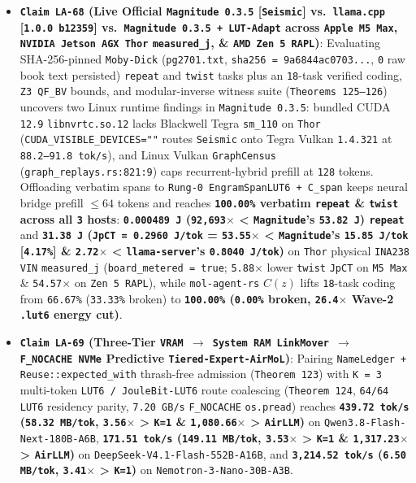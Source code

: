 \documentclass[10pt]{article}
\begin{document}
\begin{itemize}
  \item \textbf{\texttt{Claim LA-68} (Live Official \texttt{Magnitude 0.3.5} [\texttt{Seismic}] vs.\ \texttt{llama.cpp} [\texttt{1.0.0 b12359}] vs.\ \texttt{Magnitude 0.3.5 + LUT-Adapt} across \texttt{Apple M5 Max}, \texttt{NVIDIA Jetson AGX Thor} \texttt{measured\_j}, \& \texttt{AMD Zen 5 RAPL})}: Evaluating SHA-256-pinned \texttt{Moby-Dick} (\texttt{pg2701.txt}, \texttt{sha256 = 9a6844ac0703...}, \texttt{0} raw book text persisted) \texttt{repeat} and \texttt{twist} tasks plus an \texttt{18}-task verified coding, \texttt{Z3 QF\_BV} bounds, and modular-inverse witness suite (\texttt{Theorems 125--126}) uncovers two Linux runtime findings in \texttt{Magnitude 0.3.5}: bundled CUDA \texttt{12.9} \texttt{libnvrtc.so.12} lacks Blackwell Tegra \texttt{sm\_110} on \texttt{Thor} (\texttt{CUDA\_VISIBLE\_DEVICES=""} routes \texttt{Seismic} onto Tegra Vulkan \texttt{1.4.321} at \texttt{88.2--91.8 tok/s}), and Linux Vulkan \texttt{GraphCensus} (\texttt{graph\_replays.rs:821:9}) caps recurrent-hybrid prefill at \texttt{128} tokens. Offloading verbatim spans to \texttt{Rung-0 EngramSpanLUT6 + C\_span} keeps neural bridge prefill $\le 64$ tokens and reaches \textbf{\texttt{100.00\%} verbatim \texttt{repeat} \& \texttt{twist} across all \texttt{3} hosts}: \textbf{\texttt{0.000489 J} (\texttt{92,693$\times$} < \texttt{Magnitude}'s \texttt{53.82 J}) \texttt{repeat}} and \textbf{\texttt{31.38 J} (\texttt{JpCT = 0.2960 J/tok} = \texttt{53.55$\times$} < \texttt{Magnitude}'s \texttt{15.85 J/tok} [\texttt{4.17\%}] \& \texttt{2.72$\times$} < \texttt{llama-server}'s \texttt{0.8040 J/tok})} on \texttt{Thor} physical \texttt{INA238 VIN} \texttt{measured\_j} (\texttt{board\_metered = true}; \texttt{5.88$\times$} lower \texttt{twist} \texttt{JpCT} on \texttt{M5 Max} \& \texttt{54.57$\times$} on \texttt{Zen 5 RAPL}), while \texttt{mol-agent-rs} $C(z)$ lifts \texttt{18}-task coding from \texttt{66.67\%} (\texttt{33.33\%} broken) to \textbf{\texttt{100.00\%} (\texttt{0.00\%} broken, \texttt{26.4$\times$} Wave-2 \texttt{.lut6} energy cut)}.
  \item \textbf{\texttt{Claim LA-69} (Three-Tier \texttt{VRAM $\to$ System RAM LinkMover $\to$ F\_NOCACHE NVMe} Predictive \texttt{Tiered-Expert-AirMoL})}: Pairing \texttt{NameLedger + Reuse::expected\_with} thrash-free admission (\texttt{Theorem 123}) with \texttt{K = 3} multi-token \texttt{LUT6 / JouleBit-LUT6} route coalescing (\texttt{Theorem 124}, \texttt{64/64} \texttt{LUT6} residency parity, \texttt{7.20 GB/s} \texttt{F\_NOCACHE} \texttt{os.pread}) reaches \textbf{\texttt{439.72 tok/s} (\texttt{58.32 MB/tok}, \texttt{3.56$\times$} > \texttt{K=1} \& \texttt{1,080.66$\times$} > \texttt{AirLLM})} on \texttt{Qwen3.8-Flash-Next-180B-A6B}, \textbf{\texttt{171.51 tok/s} (\texttt{149.11 MB/tok}, \texttt{3.53$\times$} > \texttt{K=1} \& \texttt{1,317.23$\times$} > \texttt{AirLLM})} on \texttt{DeepSeek-V4.1-Flash-552B-A16B}, and \textbf{\texttt{3,214.52 tok/s} (\texttt{6.50 MB/tok}, \texttt{3.41$\times$} > \texttt{K=1})} on \texttt{Nemotron-3-Nano-30B-A3B}.

\end{itemize}
\end{document}
